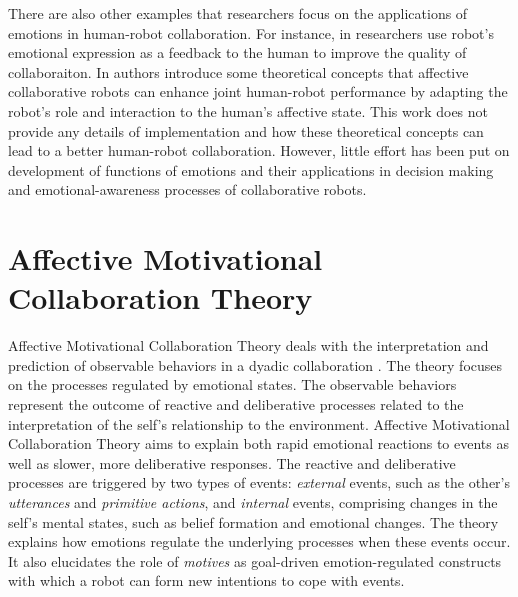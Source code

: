 \documentclass{sig-alternate-05-2015}
\begin{document}
There are also other examples that researchers focus on the applications of
emotions in human-robot collaboration. For instance, in
\cite{guha:emotion-feedback} researchers use robot's emotional expression as a
feedback to the human to improve the quality of collaboraiton. In
\cite{looije:affective-collaboration-safety} authors introduce some theoretical
concepts that affective collaborative robots can enhance joint human-robot
performance by adapting the robot's role and interaction to the human's
affective state. This work does not provide any details of implementation and
how these theoretical concepts can lead to a better human-robot collaboration.
However, little effort has been put on development of functions of emotions and
their applications in decision making and emotional-awareness processes of
collaborative robots.



 
\section{Affective Motivational Collaboration Theory}
Affective Motivational Collaboration Theory deals with the interpretation and
prediction of observable behaviors in a dyadic collaboration
\cite{shayganfar:theory-overview}. The theory focuses on the processes regulated
by emotional states. The observable behaviors represent the outcome of reactive
and deliberative processes related to the interpretation of the self's
relationship to the environment. Affective Motivational Collaboration Theory
aims to explain both rapid emotional reactions to events as well as slower, more
deliberative responses. The reactive and deliberative processes are triggered by
two types of events: \textit{external} events, such as the other's
\textit{utterances} and \textit{primitive actions}, and \textit{internal}
events, comprising changes in the self's mental states, such as belief formation
and emotional changes. The theory explains how emotions regulate the underlying
processes when these events occur. It also elucidates the role of
\textit{motives} as goal-driven emotion-regulated constructs with which a robot
can form new intentions to cope with events.
\end{document}
